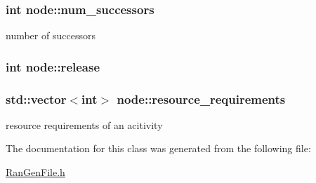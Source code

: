 \subsubsection[{num\+\_\+successors}]{\setlength{\rightskip}{0pt plus 5cm}int node\+::num\+\_\+successors}\label{classnode_a2e9517cedd7c74a4457a051eb8052f20}
number of successors \hypertarget{classnode_a7c1bb8ed64a6dd9c79de878e364d5456}{}
\subsubsection[{release}]{\setlength{\rightskip}{0pt plus 5cm}int node\+::release}\label{classnode_a7c1bb8ed64a6dd9c79de878e364d5456}
\hypertarget{classnode_a34b5f0e866924cecdda4165b565ea571}{}
\subsubsection[{resource\+\_\+requirements}]{\setlength{\rightskip}{0pt plus 5cm}std\+::vector$<$int$>$ node\+::resource\+\_\+requirements}\label{classnode_a34b5f0e866924cecdda4165b565ea571}
resource requirements of an acitivity 

The documentation for this class was generated from the following file\+:\begin{DoxyCompactItemize}
\item 
\hyperlink{_ran_gen_file_8h}{Ran\+Gen\+File.\+h}\end{DoxyCompactItemize}

